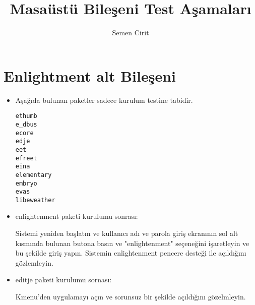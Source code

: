 \documentclass[a4paper,10pt]{article}
\title{Masaüstü Bileşeni Test Aşamaları}
\author{Semen Cirit}
\begin{document}
\maketitle
\section{Enlightment alt Bileşeni}
\begin{itemize}

 \item Aşağıda bulunan paketler sadece kurulum testine tabidir.
\begin{verbatim}
ethumb
e_dbus
ecore
edje
eet
efreet
eina
elementary
embryo
evas
libeweather
\end{verbatim}
\item enlightenment paketi kurulumu sonrası:

Sistemi yeniden başlatın ve kullanıcı adı ve parola giriş ekranının sol alt kısmında bulunan butona basın ve "enlightenment" seçeneğini işaretleyin ve bu şekilde giriş yapın. Sistemin enlightenment pencere desteği ile açıldığını gözlemleyin.


\item editje paketi kurulumu sornası:

Kmenu'den uygulamayı açın ve sorunsuz bir şekilde açıldığını gözelmleyin.

\end{itemize}
\end{document}
